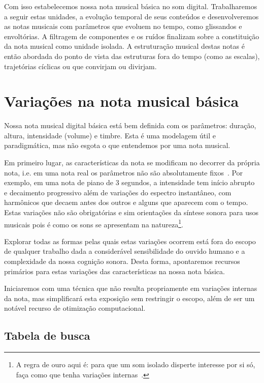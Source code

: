 Com isso estabelecemos nossa nota musical básica no som digital. Trabalharemos a seguir estas unidades, a evolução temporal de seus conteúdos e desenvolveremos as notas musicais com parâmetros que evoluem no tempo, como glissandos e envoltórias. 
A filtragem de componentes e os ruídos finalizam sobre a constituição da nota musical como unidade isolada. A estruturação musical destas notas é então abordada do ponto de vista das estruturas fora do tempo (como as escalas), trajetórias cíclicas ou que convirjam ou divirjam.

\clearpage

\section{Variações na nota musical básica}\label{varInternas}

Nossa nota musical digital básica está bem definida com os parâmetros:
duração, altura, intensidade (volume) e timbre. Esta é uma modelagem
útil e paradigmática, mas não esgota o que entendemos por
uma nota musical.

Em primeiro lugar, as características da nota se modificam no decorrer
da própria nota, i.e. em uma nota real os parâmetros
não são absolutamente fixos~\cite{Chowning}. Por exemplo, em uma nota de piano
de 3 segundos, a intensidade tem início abrupto e decaimento progressivo
além de variações do espectro instantâneo, com harmônicos que
decaem antes dos outros e alguns que aparecem com o tempo.
Estas variações não são obrigatórias e sim orientações da
síntese sonora para usos musicais pois é como os sons
se apresentam na natureza\footnote{A regra de ouro
aqui é: para que um som isolado disperte interesse
por si só, faça como que tenha variações internas~\cite{Roederer}.}. 

Explorar todas as formas pelas quais estas variações ocorrem está fora
do escopo de qualquer trabalho dada a considerável sensibilidade do ouvido humano
e a complexidade da nossa cognição sonora. Desta forma, apontaremos
recursos primários para estas variações das características na nossa nota
básica.

Iniciaremos com uma técnica que não resulta propriamente
em variações internas da nota, mas simplificará esta exposição
sem restringir o escopo, além de ser um notável recurso de otimização
computacional.



\subsection{Tabela de busca}

